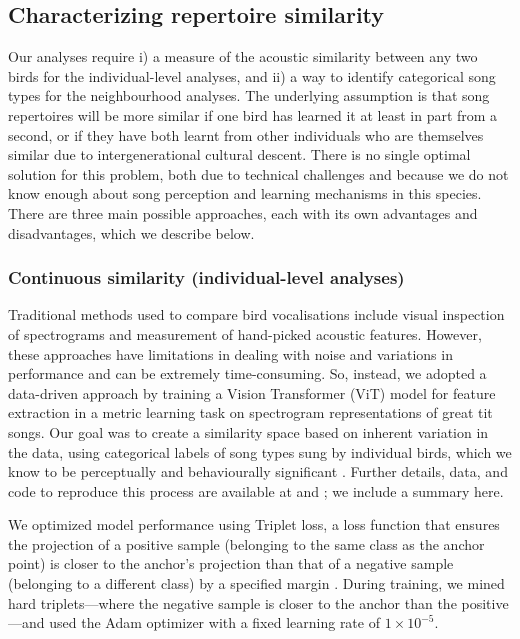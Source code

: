 \documentclass[9pt, onecolumn, twoside, lineno]{gsajnl}
\begin{document}
\subsection{Characterizing repertoire similarity}

Our analyses require i) a measure of the acoustic similarity between any two birds for the individual-level analyses, and ii) a way to identify categorical song types for the neighbourhood analyses. The underlying assumption is that song repertoires will be more similar if one bird has learned it at least in part from a second, or if they have both learnt from other individuals who are themselves similar due to intergenerational cultural descent. There is no single optimal solution for this problem, both due to technical challenges and because we do not know enough about song perception and learning mechanisms in this species. There are three main possible approaches, each with its own advantages and disadvantages, which we describe below.

\subsubsection{Continuous similarity (individual-level analyses)}
\label{sc:song-similarity}

Traditional methods used to compare bird vocalisations include visual inspection of spectrograms and measurement of hand-picked acoustic features. However, these approaches have limitations in dealing with noise and variations in performance and can be extremely time-consuming. So, instead, we adopted a data-driven approach by training a Vision Transformer (ViT) model for feature extraction in a metric learning task on spectrogram representations of great tit songs. Our goal was to create a similarity space based on inherent variation in the data, using categorical labels of song types sung by individual birds, which we know to be perceptually and behaviourally significant \autocite{lind1996}. Further details, data, and code to reproduce this process are available at \autocite{merinorecalde2023} and \autocite{merinorecalde2023a}; we include a summary here.

We optimized model performance using Triplet loss, a loss function that ensures the projection of a positive sample (belonging to the same class as the anchor point) is closer to the anchor's projection than that of a negative sample (belonging to a different class) by a specified margin \autocite{hermans2017, hoffer2018}. During training, we mined hard triplets---where the negative sample is closer to the anchor than the positive---and used the Adam optimizer with a fixed learning rate of $1 \times 10^{-5}$.
\end{document}
